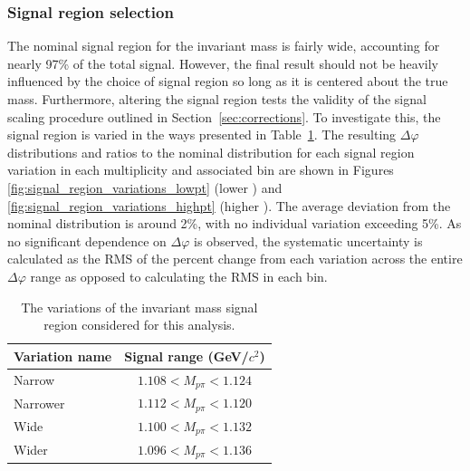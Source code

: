 \subsubsection{Signal region selection}
The nominal signal region for the \lmb invariant mass is fairly wide, accounting for nearly 97\% of the total \lmb signal.  However, the final result should not be heavily influenced by the choice of signal region so long as it is centered about the true \lmb mass. Furthermore, altering the signal region tests the validity of the signal scaling procedure outlined in Section~\ref{sec:corrections}. To investigate this, the signal region is varied in the ways presented in Table~\ref{tab:signal_region_variations}. The resulting $\Delta\varphi$ distributions and ratios to the nominal distribution for each signal region variation in each multiplicity and associated \pt bin are shown in Figures \ref{fig:signal_region_variations_lowpt} (lower \pt) and \ref{fig:signal_region_variations_highpt} (higher \pt). The average deviation from the nominal distribution is around 2\%, with no individual variation exceeding 5\%. As no significant dependence on $\Delta\varphi$ is observed, the systematic uncertainty is calculated as the RMS of the percent change from each variation across the entire $\Delta\varphi$ range as opposed to calculating the RMS in each bin.

\begin{table}[ht]
    \centering
    \caption{The variations of the \lmb invariant mass signal region considered for this analysis.}
    \label{tab:signal_region_variations}
    \begin{tabular}{l c}
        \hline
        Variation name & Signal range (GeV/$c^2$) \\
        \hline
        Narrow & $1.108 < M_{p\pi} < 1.124$ \\
        Narrower & $1.112 < M_{p\pi} < 1.120$ \\
        Wide & $1.100 < M_{p\pi} < 1.132$ \\
        Wider & $1.096 < M_{p\pi} < 1.136$ \\
        \hline
    \end{tabular}
\end{table}

